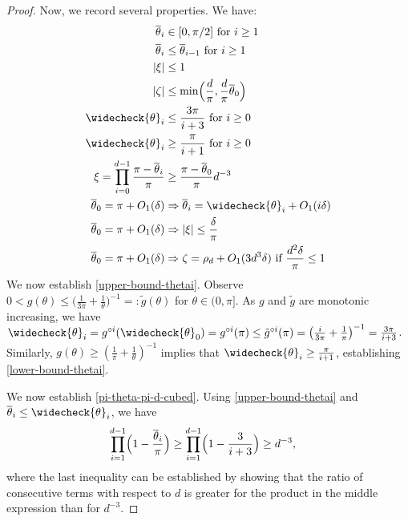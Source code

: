 \documentclass[11pt]{article}
\newcommand{\gtilde}{\tilde{g}}
\newcommand{\thetabar}{\overline{\theta}}
\newcommand{\thetacheck}{\widecheck{\theta}}
\newcommand{\zetacheck}{\rho}
\newcommand{\red}[1]{{\color{black} #1}}
\begin{document}
\begin{proof}
Now, we record several properties.  We have:
\begin{align}
\thetabar_{i} &\in [0, \pi/2] \text{ for } i \geq \red{1} \notag \\
\thetabar_{i} &\leq \thetabar_{i-1} \text{ for } i \geq 1 \notag\\
 |\xi| &\leq 1 \label{bound-c-one}\\
| \zeta| &\leq \red{\min \Bigl(\frac{d}{\pi}, \frac{d}{\pi} \thetabar_0 \Bigr)} \label{zeta-bound-d-sin-theta} \\
\thetacheck_i &\leq \frac{3\pi}{i+3} \text{ for $i \geq 0$} \label{upper-bound-thetai}\\
\thetacheck_i &\geq \frac{\pi}{i+1} \text{ for $i \geq 0$} \label{lower-bound-thetai}\\
\xi = \prod_{i=0}^{d-1} \frac{\pi - \thetabar_i}{\pi} &\geq \frac{\pi - \thetabar_0}{\pi } d^{-3} \label{pi-theta-pi-d-cubed}\\
\thetabar_0 = \pi + O_1(\delta) &\Rightarrow \thetabar_i = \thetacheck_i + O_1(i \delta) \label{thetabar-thetacheck-bound}\\
\thetabar_0 = \pi + O_1(\delta) &\Rightarrow |\xi| \leq \frac{\delta}{\pi} \label{c-one-bound-thetabarzero}\\
\thetabar_0 = \pi + O_1(\delta) &\Rightarrow \zeta = \zetacheck_d + O_1(3 d^3 \delta) \text{ if } \frac{d^2 \delta}{\pi} \leq 1 \label{high-theta-zeta-zetabar-control}
\end{align}
We now establish \eqref{upper-bound-thetai}.  Observe $0< g(\theta) \leq \bigl( \frac{1}{3 \pi} + \frac{1}{\theta} \bigr)^{-1} =: \gtilde(\theta)$ for $\theta \in (0, \pi]$.  As $g$ and $\gtilde$ are monotonic increasing, we have $\thetacheck_i = g^{\circ i}(\thetacheck_0) = g^{\circ i}(\pi) \leq \gtilde^{\circ i}(\pi) = \bigl( \frac{i}{3 \pi} + \frac{1}{\pi} \bigr)^{-1} = \frac{3\pi}{i + 3}$.  Similarly, $g(\theta) \geq (\frac{1}{\pi} + \frac{1}{\theta})^{-1}$ implies that $\thetacheck_i \geq \frac{\pi}{i+1}$, establishing \eqref{lower-bound-thetai}. 

We now establish \eqref{pi-theta-pi-d-cubed}.  Using \eqref{upper-bound-thetai} and $\thetabar_i \leq \thetacheck_i$, we have
\begin{align*}
\prod_{i=1}^{d-1} \Bigl(1 - \frac{\thetabar_i}{\pi} \Bigr) &\geq \prod_{i=1}^{d-1} \Bigl(1 - \frac{3}{i+3}  \Bigr)
\geq d^{-3},
\end{align*}
where the last inequality can be established by showing that the ratio of consecutive terms with respect to $d$ is greater for the product in the middle expression than for $d^{-3}$.


\end{proof}
\end{document}
